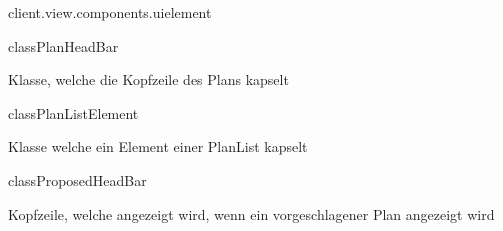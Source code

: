 \begin{texdocpackage}{client.view.components.uielement}
\begin{texdocclass}{class}{PlanHeadBar}
\label{texdoclet:edu.kit.informatik.studyplan.client.view.components.uielement.PlanHeadBar}
\begin{texdocclassintro}
Klasse, welche die Kopfzeile des Plans kapselt\end{texdocclassintro}
\begin{texdocclassfields}
\end{texdocclassfields}
\begin{texdocclassconstructors}
\end{texdocclassconstructors}
\begin{texdocclassmethods}
\end{texdocclassmethods}
\end{texdocclass}


\begin{texdocclass}{class}{PlanListElement}
\label{texdoclet:edu.kit.informatik.studyplan.client.view.components.uielement.PlanListElement}
\begin{texdocclassintro}
Klasse welche ein Element einer PlanList kapselt\end{texdocclassintro}
\begin{texdocclassfields}
\end{texdocclassfields}
\begin{texdocclassconstructors}
\end{texdocclassconstructors}
\begin{texdocclassmethods}
\end{texdocclassmethods}
\end{texdocclass}


\begin{texdocclass}{class}{ProposedHeadBar}
\label{texdoclet:edu.kit.informatik.studyplan.client.view.components.uielement.ProposedHeadBar}
\begin{texdocclassintro}
Kopfzeile, welche angezeigt wird, wenn ein vorgeschlagener Plan angezeigt
 wird\end{texdocclassintro}
\begin{texdocclassconstructors}
\end{texdocclassconstructors}
\end{texdocclass}



\end{texdocpackage}
